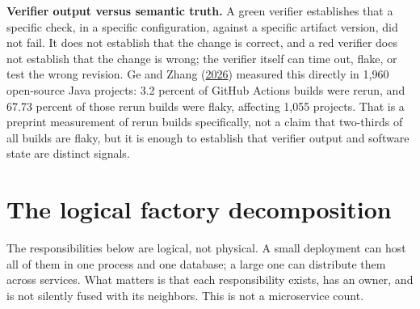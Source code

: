 \textbf{Verifier output versus semantic truth.} A green verifier establishes that a specific check, in a specific configuration, against a specific artifact version, did not fail. It does not establish that the change is correct, and a red verifier does not establish that the change is wrong; the verifier itself can time out, flake, or test the wrong revision. Ge and Zhang (\href{https://arxiv.org/abs/2602.02307}{2026}) measured this directly in 1,960 open-source Java projects: 3.2 percent of GitHub Actions builds were rerun, and 67.73 percent of those rerun builds were flaky, affecting 1,055 projects. That is a preprint measurement of rerun builds specifically, not a claim that two-thirds of all builds are flaky, but it is enough to establish that verifier output and software state are distinct signals.

\hypertarget{the-logical-factory-decomposition}{%
\section*{The logical factory decomposition}\label{the-logical-factory-decomposition}}

The responsibilities below are logical, not physical. A small deployment can host all of them in one process and one database; a large one can distribute them across services. What matters is that each responsibility exists, has an owner, and is not silently fused with its neighbors. This is not a microservice count.

